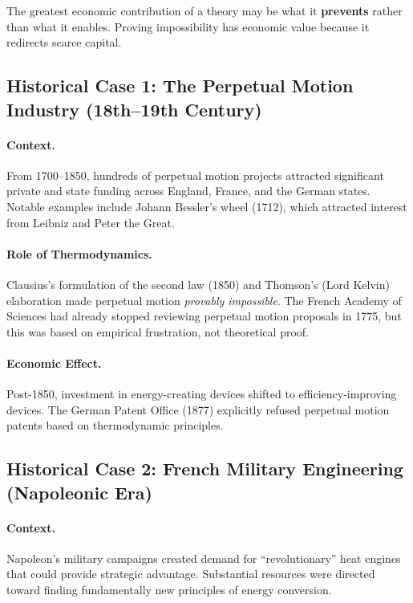 \begin{tcolorbox}[colback=yellow!5!white, colframe=yellow!75!black,
    title=Core Insight: Negative Utility]
The greatest economic contribution of a theory may be what it \textbf{prevents}
rather than what it enables. Proving impossibility has economic value because
it redirects scarce capital.
\end{tcolorbox}

\subsection{Historical Case 1: The Perpetual Motion Industry (18th--19th Century)}

\paragraph{Context.} From 1700--1850, hundreds of perpetual motion projects
attracted significant private and state funding across England, France, and
the German states. Notable examples include Johann Bessler's wheel (1712),
which attracted interest from Leibniz and Peter the Great.

\paragraph{Role of Thermodynamics.} Clausius's formulation of the second law
(1850) and Thomson's (Lord Kelvin) elaboration made perpetual motion
\textit{provably impossible}. The French Academy of Sciences had already
stopped reviewing perpetual motion proposals in 1775, but this was based on
empirical frustration, not theoretical proof.

\paragraph{Economic Effect.} Post-1850, investment in energy-creating devices
shifted to efficiency-improving devices. The German Patent Office (1877)
explicitly refused perpetual motion patents based on thermodynamic principles.

\subsection{Historical Case 2: French Military Engineering (Napoleonic Era)}

\paragraph{Context.} Napoleon's military campaigns created demand for
``revolutionary'' heat engines that could provide strategic advantage.
Substantial resources were directed toward finding fundamentally new
principles of energy conversion.

